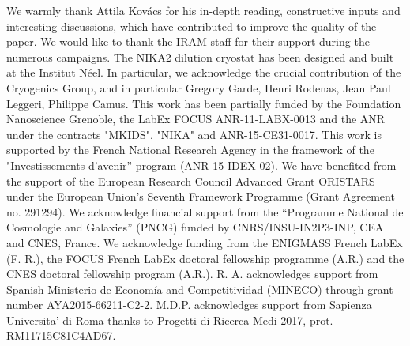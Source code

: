 \documentclass[traditionalabstract]{aa}
\newcommand{\rev}[1]{#1}
\begin{document}
\begin{acknowledgements}
  {\rev We warmly thank Attila Kov\'acs for his in-depth reading,
    constructive inputs and interesting discussions, which have
    contributed to improve the quality of the paper.}
  We would like to thank the IRAM staff for their support during the
  numerous campaigns. 
  The NIKA2 dilution cryostat has been designed and built at the Institut N\'eel. 
  In particular, we acknowledge the crucial contribution of the Cryogenics Group, and 
  in particular Gregory Garde, Henri Rodenas, Jean Paul Leggeri, Philippe Camus. 
  This work has been partially funded by the Foundation Nanoscience
  Grenoble, the LabEx FOCUS ANR-11-LABX-0013 and the ANR under the
  contracts "MKIDS", "NIKA" and ANR-15-CE31-0017. This work is
  supported by the French National Research Agency in the framework of
  the "Investissements d’avenir” program (ANR-15-IDEX-02).
  We have benefited from the support of the European Research Council Advanced
  Grant ORISTARS under the European Union's Seventh Framework
  Programme (Grant Agreement no. 291294). We acknowledge financial
  support from the “Programme National de Cosmologie and Galaxies”
  (PNCG) funded by CNRS/INSU-IN2P3-INP, CEA and CNES, France.
  We acknowledge funding from the ENIGMASS French LabEx (F. R.), the FOCUS French
  LabEx doctoral fellowship programme (A.R.) and the CNES doctoral
  fellowship program (A.R.). R. A. acknowledges support from
  Spanish Ministerio de Econom\'ia and Competitividad (MINECO) through
  grant number AYA2015-66211-C2-2. M.D.P. acknowledges support from
  Sapienza Universita' di Roma thanks to Progetti di Ricerca Medi 2017,
  prot. RM11715C81C4AD67. 
\end{acknowledgements}

%
%
\end{document}
